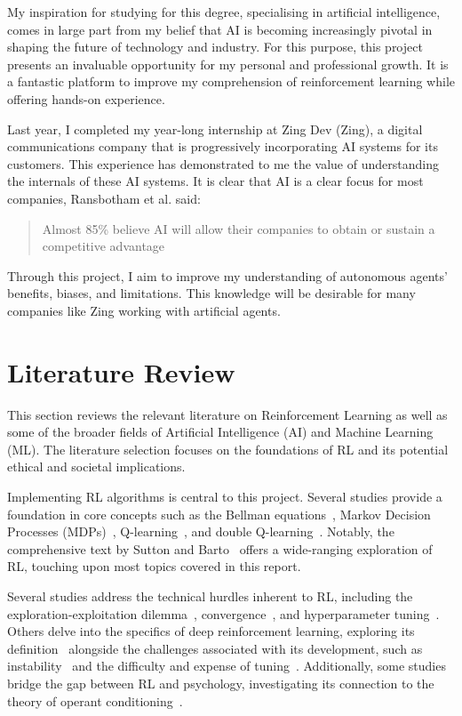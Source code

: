 \documentclass[]{final_report}
\begin{document}
My inspiration for studying for this degree, specialising in artificial intelligence, comes in large part from my belief that AI is becoming increasingly pivotal in shaping the future of technology and industry. For this purpose, this project presents an invaluable opportunity for my personal and professional growth. It is a fantastic platform to improve my comprehension of reinforcement learning while offering hands-on experience. 

Last year, I completed my year-long internship at Zing Dev (Zing), a digital communications company that is progressively incorporating AI systems for its customers. This experience has demonstrated to me the value of understanding the internals of these AI systems. It is clear that AI is a clear focus for most companies, Ransbotham et al. said: 
\begin{quote}
  Almost 85\% believe AI will allow their companies to obtain or sustain a competitive advantage~\cite{ransbotham2017reshaping}
\end{quote}

Through this project, I aim to improve my understanding of autonomous agents' benefits, biases, and limitations. This knowledge will be desirable for many companies like Zing working with artificial agents.


\section{Literature Review}\label{sect:literature-review}

This section reviews the relevant literature on Reinforcement Learning as well as some of the broader fields of Artificial Intelligence (AI) and Machine Learning (ML). The literature selection focuses on the foundations of RL and its potential ethical and societal implications.

Implementing RL algorithms is central to this project. Several studies provide a foundation in core concepts such as the Bellman equations~\cite{bellman1957}, Markov Decision Processes (MDPs)~\cite{meyn2012markov,sutton2018reinforcement}, Q-learning~\cite{watkins1992q}, and double Q-learning~\cite{doubleQLearning}. Notably, the comprehensive text  by Sutton and Barto~\cite{sutton2018reinforcement} offers a wide-ranging exploration of RL, touching upon most topics covered in this report.

Several studies address the technical hurdles inherent to RL, including the exploration-exploitation dilemma~\cite{rewardEpsilonDecay}, convergence~\cite{watkins1992q, QlearningConvergance}, and hyperparameter tuning~\cite{deepRLChallanges, searchStrategies}. Others delve into the specifics of deep reinforcement learning, exploring its definition~\cite{deepRLOverview} alongside the challenges associated with its development, such as instability~\cite{deepOnVsOffPolicy,sutton2018reinforcement} and the difficulty and expense of tuning~\cite{deepRLChallanges, DeepRLCost}. Additionally, some studies bridge the gap between RL and psychology, investigating its connection to the theory of operant conditioning~\cite{shteingart2014reinforcement,staddon2003operant}.
\end{document}
